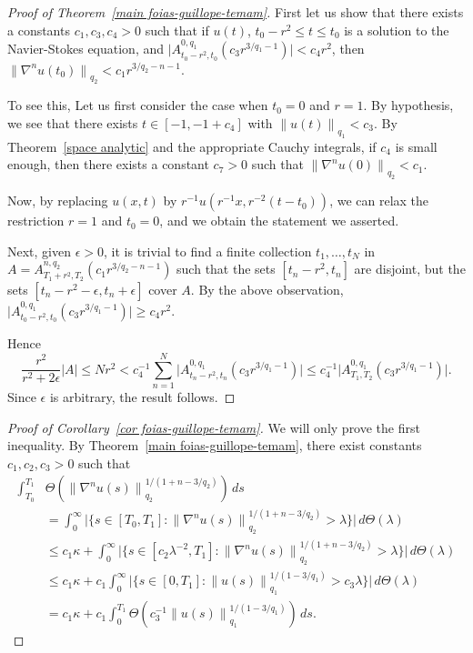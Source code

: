 \documentclass[12pt]{amsart}
\theoremstyle{remark}
\newcommand{\smodo}[1]{{\mathopen|#1\mathclose|}}
\newcommand{\snormo}[1]{{\mathopen\|#1\mathclose\|}}
\begin{document}
\begin{proof}[Proof of Theorem~\ref{main foias-guillope-temam}]
First let us show that
there exists
a constants $c_1,c_3,c_4>0$ such that 
if $u(t)$, $t_0-r^2 \le t \le t_0$ 
is a solution to the Navier-Stokes equation,
and 
$\smodo{A^{0,q_1}_{t_0-r^2,t_0}(c_3 r^{3/q_1-1})} < c_4 r^2$, then
$\snormo{\nabla^n u(t_0)}_{q_2} < c_1 r^{3/q_2-n-1}$.

To see this,
Let us first consider the case when $t_0 = 0$ and $r = 1$.
By hypothesis, we see that there exists
$t \in [-1,-1+c_4]$
with
$ \snormo{u(t)}_{q_1} < c_3$.  
By Theorem~\ref{space analytic} and the appropriate Cauchy integrals, 
if $c_4$
is small enough, then there exists a constant $c_7>0$ such that
$\snormo{\nabla^n u(0)}_{q_2} < c_1$.  

Now, by replacing 
$u(x,t)$
by
$r^{-1} u(r^{-1}x,r^{-2}(t-t_0))$, we can relax the restriction $r=1$ and
$t_0=0$, and we obtain the statement we asserted.

Next, given $\epsilon>0$,
it is trivial to find a finite collection $t_1,\dots,t_N$
in $A = A^{n,q_2}_{T_1+r^2,T_2}(c_1 r^{3/q_2-n-1})$
such that the sets $[t_n-r^2,t_n]$ are disjoint, but the sets
$[t_n-r^2-\epsilon,t_n+\epsilon]$ cover $A$.
By the above observation,
$\smodo{A^{0,q_1}_{t_0-r^2,t_0}(c_3 r^{3/q_1-1})} \ge c_4 r^2$.

Hence
$$
   \frac{r^2}{r^2+2\epsilon}\smodo{A}
   \le
   N r^2
   <
   c_4^{-1} 
   \sum_{n=1}^N 
   \smodo{A^{0,q_1}_{t_n-r^2,t_n}(c_3 r^{3/q_1-1})} 
   \le
   c_4^{-1} 
   \smodo{A^{0,q_1}_{T_1,T_2}(c_3 r^{3/q_1-1})} .
$$
Since $\epsilon$ is arbitrary, the result follows.
\end{proof}

\begin{proof}[Proof of Corollary~\ref{cor foias-guillope-temam}]
We will only prove the first inequality.  By 
Theorem~\ref{main foias-guillope-temam}, there exist constants 
$c_1,c_2,c_3>0$ such
that
\begin{align*}
   \int_{T_0}^{T_1}&\Theta(\snormo{\nabla^n u(s)}_{q_2}^{1/(1+n-3/q_2)}) \, ds\\
   &=
   \int_0^\infty \smodo{\{s\in[T_0,T_1] : 
   \snormo{\nabla^n u(s)}_{q_2}^{1/(1+n-3/q_2)}>\lambda\}} \, d\Theta(\lambda)\\
   &\le
   c_1\kappa + 
   \int_0^\infty \smodo{\{s\in[c_2 \lambda^{-2},T_1] : 
   \snormo{\nabla^n u(s)}_{q_2}^{1/(1+n-3/q_2)}>\lambda\}} \, d\Theta(\lambda)\\
   &\le
   c_1 \kappa +
   c_1 \int_0^\infty \smodo{\{s\in[0,T_1] : 
   \snormo{u(s)}_{q_1}^{1/(1-3/q_1)} > c_3 \lambda\}} \, d\Theta(\lambda)\\
   &= 
   c_1 \kappa + c_1 \int_0^{T_1} 
   \Theta(c_3^{-1}\snormo{u(s)}_{q_1}^{1/(1-3/q_1)}) \, ds .
\end{align*}
\end{proof}
\end{document}
